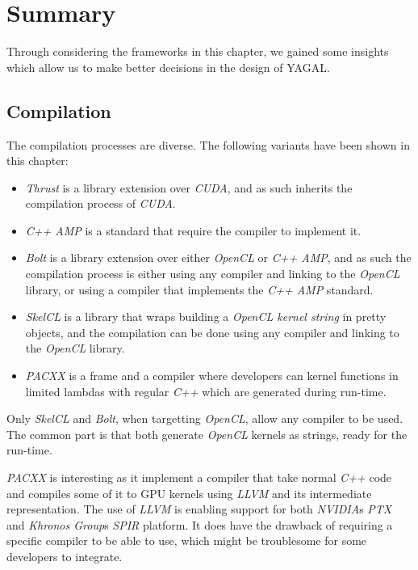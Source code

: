 \section{Summary}
Through considering the frameworks in this chapter, we gained some insights which allow us to make better decisions in the design of YAGAL.

\subsection{Compilation}
The compilation processes are diverse. The following variants have been shown in this chapter:

\begin{itemize}
\item \textit{Thrust} is a library extension over \textit{CUDA}, and as such inherits the compilation process of \textit{CUDA}.
\item \textit{C++ AMP} is a standard that require the compiler to implement it.
\item \textit{Bolt} is a library extension over either \textit{OpenCL} or \textit{C++ AMP}, and as such the compilation process is either using any compiler and linking to the \textit{OpenCL} library, or using a compiler that implements the \textit{C++ AMP} standard.
\item \textit{SkelCL} is a library that wraps building a \textit{OpenCL kernel string} in pretty objects, and the compilation can be done using any compiler and linking to the \textit{OpenCL} library.
\item \textit{PACXX} is a frame and a compiler where developers can kernel functions in limited lambdas with regular \textit{C++} which are generated during run-time.
\end{itemize}

Only \textit{SkelCL} and \textit{Bolt}, when targetting \textit{OpenCL}, allow any compiler to be used. The common part is that both generate \textit{OpenCL} kernels as strings, ready for the run-time.

\textit{PACXX} is interesting as it implement a compiler that take normal \textit{C++} code and compiles some of it to GPU kernels using \textit{LLVM} and its intermediate representation. The use of \textit{LLVM} is enabling support for both \textit{NVIDIA}s \textit{PTX} and \textit{Khronos Group}s \textit{SPIR} platform. It does have the drawback of requiring a specific compiler to be able to use, which might be troublesome for some developers to integrate.

